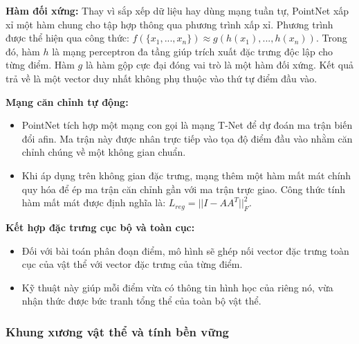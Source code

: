 \textbf{Hàm đối xứng:} Thay vì sắp xếp dữ liệu hay dùng mạng tuần tự, PointNet xấp xỉ một hàm chung cho tập hợp thông qua phương trình xấp xỉ. Phương trình được thể hiện qua công thức: $f(\{x_1,...,x_n\}) \approx g(h(x_1),...,h(x_n))$. Trong đó, hàm $h$ là mạng perceptron đa tầng giúp trích xuất đặc trưng độc lập cho từng điểm. Hàm $g$ là hàm gộp cực đại đóng vai trò là một hàm đối xứng. Kết quả trả về là một vector duy nhất không phụ thuộc vào thứ tự điểm đầu vào.


\textbf{Mạng căn chỉnh tự động:}
\begin{itemize}
    \item PointNet tích hợp một mạng con gọi là mạng T-Net để dự đoán ma trận biến đổi afin. Ma trận này được nhân trực tiếp vào tọa độ điểm đầu vào nhằm căn chỉnh chúng về một không gian chuẩn.
    \item Khi áp dụng trên không gian đặc trưng, mạng thêm một hàm mất mát chính quy hóa để ép ma trận căn chỉnh gần với ma trận trực giao. Công thức tính hàm mất mát được định nghĩa là: $L_{reg} = ||I - AA^T||_F^2$.
\end{itemize}

\textbf{Kết hợp đặc trưng cục bộ và toàn cục:}
\begin{itemize}
    \item Đối với bài toán phân đoạn điểm, mô hình sẽ ghép nối vector đặc trưng toàn cục của vật thể với vector đặc trưng của từng điểm.
    \item Kỹ thuật này giúp mỗi điểm vừa có thông tin hình học của riêng nó, vừa nhận thức được bức tranh tổng thể của toàn bộ vật thể.
\end{itemize}

\subsubsection{Khung xương vật thể và tính bền vững}

